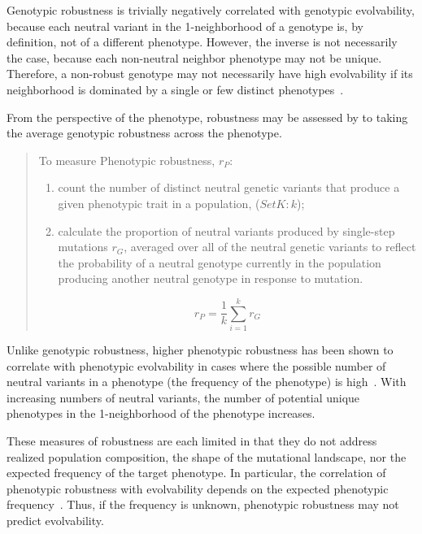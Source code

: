 \documentclass[PhD]{msu-thesis}
\begin{document}
Genotypic robustness is trivially negatively correlated with genotypic evolvability, because each neutral variant in the 1-neighborhood of a genotype is, by definition, not of a different phenotype. However, the inverse is not necessarily the case, because each non-neutral neighbor phenotype may not be unique. Therefore, a non-robust genotype may not necessarily have high evolvability if its neighborhood is dominated by a single or few distinct phenotypes~\cite{andreas_wagner_robustness_2008}.

From the perspective of the phenotype, robustness may be assessed by to taking the average genotypic robustness across the phenotype.

	\begin{quote}
	To measure Phenotypic robustness, $r_P$:

	\begin{enumerate}
	\item count the number of distinct neutral genetic variants that produce a given phenotypic trait in a population, ($Set K: k$);
	\item calculate the proportion of neutral variants produced by single-step mutations $r_G$, averaged over all of the neutral genetic variants to reflect the probability of a neutral genotype currently in the population producing another neutral genotype in response to mutation.
	\end{enumerate}
	\begin{equation}
	r_{P} = \frac{1}{k} \sum_{i=1}^{k} r_{G} 
	\end{equation}
	\end{quote}

Unlike genotypic robustness, higher phenotypic robustness has been shown to correlate with phenotypic evolvability in cases where the possible number of neutral variants in a phenotype (the frequency of the phenotype) is high~\cite{andreas_wagner_robustness_2008}. With increasing numbers of neutral variants, the number of potential unique phenotypes in the 1-neighborhood of the phenotype increases.

These measures of robustness are each limited in that they do not address realized population composition, the shape of the mutational landscape, nor the expected frequency of the target phenotype. In particular, the correlation of phenotypic robustness with evolvability depends on the expected phenotypic frequency~\cite{andreas_wagner_robustness_2008}. Thus, if the frequency is unknown, phenotypic robustness may not predict evolvability.
\end{document}
